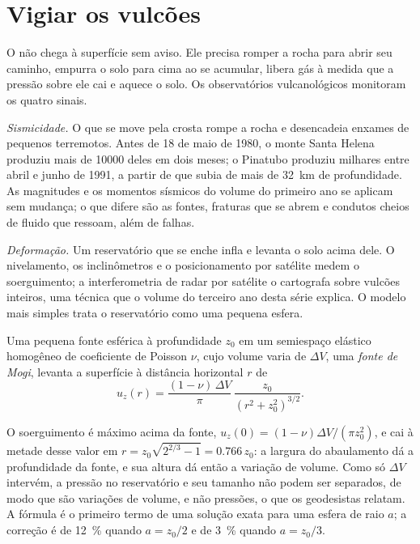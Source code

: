 \section{Vigiar os vulcões}

O  não chega à superfície sem aviso. Ele precisa romper a rocha para abrir seu
caminho, empurra o solo para cima ao se acumular, libera gás à medida que a pressão
sobre ele cai e aquece o solo. Os observatórios vulcanológicos monitoram os quatro sinais.

\emph{Sismicidade.} O  que se move pela crosta rompe a rocha e desencadeia enxames
de pequenos terremotos. Antes de 18 de maio de 1980, o monte Santa Helena produziu mais de
\num{10000} deles em dois meses; o Pinatubo produziu milhares entre abril e
junho de 1991, a partir de  que subia de mais de \qty{32}{km} de profundidade. As magnitudes
e os momentos sísmicos do volume do primeiro ano se aplicam sem mudança; o que difere são as
fontes, fraturas que se abrem e condutos cheios de fluido que ressoam, além de falhas.

\emph{Deformação.} Um reservatório que se enche infla e levanta o solo acima
dele. O nivelamento, os inclinômetros e o posicionamento por satélite medem o soerguimento; a interferometria de radar por satélite o cartografa sobre vulcões
inteiros, uma técnica que o volume do terceiro ano desta série explica. O modelo mais
simples trata o reservatório como uma pequena esfera.

\begin{proposition}\label{prop:b2:eruptive-styles:mogi}
Uma pequena fonte esférica à profundidade $z_0$ em um semiespaço elástico homogêneo
de coeficiente de Poisson $\nu$, cujo volume varia de $\Delta V$, uma
\emph{fonte de Mogi}, levanta a superfície à distância horizontal $r$
de
\[
u_z(r) = \frac{(1 - \nu)\,\Delta V}{\pi}\,\frac{z_0}{(r^2 + z_0^2)^{3/2}} .
\]
\end{proposition}
\admitted

O soerguimento é máximo acima da fonte, $u_z(0) = (1 - \nu)\Delta V/(\pi z_0^2)$, e
cai à metade desse valor em $r = z_0\sqrt{2^{2/3} - 1} = 0.766\,z_0$: a largura do
abaulamento dá a profundidade da fonte, e sua altura dá então a variação de
volume. Como só $\Delta V$ intervém, a pressão no reservatório e seu tamanho
não podem ser separados, de modo que são variações de volume, e não pressões, o que os geodesistas
relatam. A fórmula é o primeiro termo de uma solução exata para uma esfera de raio
$a$; a correção é de \qty{12}{\percent} quando $a = z_0/2$ e de \qty{3}{\percent}
quando $a = z_0/3$.


